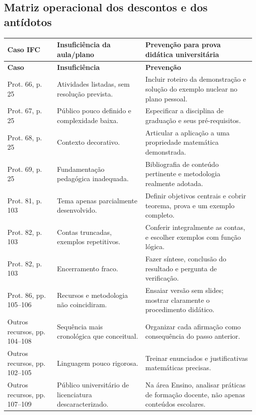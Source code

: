 \documentclass[11pt,a4paper]{article}
\begin{document}
\subsection{Matriz operacional dos descontos e dos antídotos}
\small
{}
\begin{longtable}{p{}p{}p{}}
\toprule
\textbf{Caso IFC} & \textbf{Insuficiência da aula/plano} & \textbf{Prevenção para prova didática universitária}\\\midrule
\endfirsthead
\toprule\textbf{Caso}&\textbf{Insuficiência}&\textbf{Prevenção}\\\midrule\endhead
Prot. 66, p. 25 & Atividades listadas, sem resolução prevista. & Incluir roteiro da demonstração e solução do exemplo nuclear no plano pessoal.\\
Prot. 67, p. 25 & Público pouco definido e complexidade baixa. & Especificar a disciplina de graduação e seus pré-requisitos.\\
Prot. 68, p. 25 & Contexto decorativo. & Articular a aplicação a uma propriedade matemática demonstrada.\\
Prot. 69, p. 25 & Fundamentação pedagógica inadequada. & Bibliografia de conteúdo pertinente e metodologia realmente adotada.\\
Prot. 81, p. 103 & Tema apenas parcialmente desenvolvido. & Definir objetivos centrais e cobrir teorema, prova e um exemplo completo.\\
Prot. 82, p. 103 & Contas truncadas, exemplos repetitivos. & Conferir integralmente as contas, e escolher exemplos com função lógica.\\
Prot. 82, p. 103 & Encerramento fraco. & Fazer síntese, conclusão do resultado e pergunta de verificação.\\
Prot. 86, pp. 105--106 & Recursos e metodologia não coincidiram. & Ensaiar versão sem slides; mostrar claramente o procedimento didático.\\
Outros recursos, pp. 104--108 & Sequência mais cronológica que conceitual. & Organizar cada afirmação como consequência do passo anterior.\\
Outros recursos, pp. 102--105 & Linguagem pouco rigorosa. & Treinar enunciados e justificativas matemáticas precisas.\\
Outros recursos, pp. 107--109 & Público universitário de licenciatura descaracterizado. & Na área Ensino, analisar práticas de formação docente, não apenas conteúdos escolares.\\
\bottomrule
\end{longtable}
\normalsize{}
\end{document}
